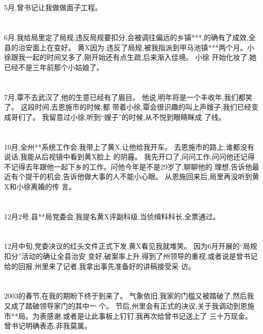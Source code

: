 \documentclass[11pt]{article}
\begin{document}
\section{}
5月,曾书记让我做做面子工程。

\section{}
6月,我给局里定了局规,违反局规要扣分,会被调往偏远的乡镇***,的确有了成效,全县的治安面上在变好。 黄X因为
违反了局规,被我指派到甲马池镇***两个月。小徐跟我一起的时间又多了,刚开始还有点生疏,后来渐入佳境。 小徐
开始化妆了,她已经不是三年前那个小姑娘了。

\section{}
7月,覃不去武汉了,他的生意已经有了眉目。 他说,明年将是一个丰收年,我们都笑了。 这段时间,去恩施市的时候,都
带着小徐,覃会很识趣的叫上声嫂子,我们已经变成哥们了。 我留意过小徐,听到``嫂子''的时候,从不悦到眼睛眯成
了线。

\section{}
10月,全州**系统工作会,我带上了黄X,让他给我开车。 去恩施市的路上,谁都没有说话,我能从后视镜中看到黄X脸上
的阴霾。 我先开口了,问问工作,问问他还记得不记得去年跟他一起下乡的工作。问他今年是不是29岁了,聊聊他的
理想,告诉他最近有个提干的机会,告诉他做大事的人不能小心眼。 从恩施回来后,局里再没听到黄X和小徐离婚的传
言。

\section{}
12月2号,县**局党委会,我提名黄X评副科级,当侦缉科科长,全票通过。

\section{}
12月中旬,党委决议的红头文件正式下发,黄X看见我就堆笑。 因为6月开展的``局规扣分''活动的确让全县治安
变好,破案率上升,得到了州领导的重视,或者说是曾书记给的回报,州里来了记者,我拿出事先准备好的讲稿接受采
访。

\section{}
2003的春节,在我的期盼下终于到来了。 气象依旧,我家的门槛又被踏破了,然后我又成了踏破领导家门的其中一
个。 节后,州里会有正式的决议,关于我调动到恩施市**局。为表感谢,或者是让此事板上钉钉,我再次给曾书记送上了
三十万现金。 曾书记明确表态,非我莫属。
\end{document}
